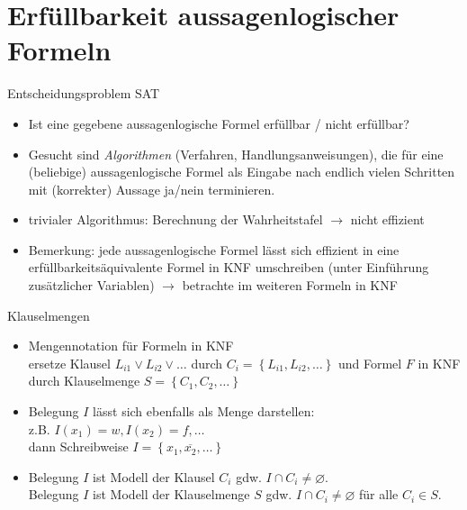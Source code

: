 \section{Erfüllbarkeit aussagenlogischer Formeln}
\begin{frame}{Entscheidungsproblem SAT}
	\begin{itemize}
		\item Ist eine gegebene aussagenlogische Formel erfüllbar / nicht erfüllbar?
		\item Gesucht sind \emph{Algorithmen} (Verfahren, Handlungsanweisungen), die für eine (beliebige) aussagenlogische Formel als Eingabe nach endlich vielen Schritten mit (korrekter) Aussage ja/nein terminieren.
		\item trivialer Algorithmus: Berechnung der Wahrheitstafel $\rightarrow$ nicht effizient
		\item Bemerkung: jede aussagenlogische Formel lässt sich effizient in eine erfüllbarkeitsäquivalente Formel in KNF umschreiben (unter Einführung zusätzlicher Variablen) $\rightarrow$ betrachte im weiteren Formeln in KNF
	\end{itemize}
\end{frame}

\begin{frame}{Klauselmengen}
	\begin{itemize}
		\item Mengennotation für Formeln in KNF\\
		ersetze Klausel $L_{i1} \lor L_{i2} \lor \ldots$ durch $C_i = \left\{L_{i1}, L_{i2}, \ldots\right\}$ und Formel $F$ in KNF durch Klauselmenge $S=\left\{C_1, C_2, \ldots\right\}$
		\item Belegung $I$ lässt sich ebenfalls als Menge darstellen:\\
		z.B. $I(x_1)=w, I(x_2)=f, \ldots$\\
		dann Schreibweise $I=\left\{x_1, \overline{x_2}, \ldots\right\}$
		\item Belegung $I$ ist Modell der Klausel $C_i$ gdw. $I \cap C_i \neq \varnothing$.\\
		Belegung $I$ ist Modell der Klauselmenge $S$ gdw. $I \cap C_i \neq \varnothing$ für alle $C_i \in S$.
	\end{itemize}
\end{frame}

